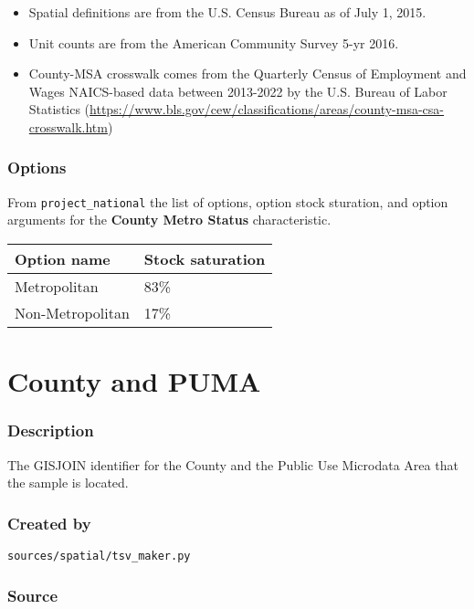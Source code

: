 \begin{itemize}
 
\item
  Spatial definitions are from the U.S. Census Bureau as of July 1,
  2015.
\item
  Unit counts are from the American Community Survey 5-yr 2016.
\item
  County-MSA crosswalk comes from the Quarterly Census of Employment and
  Wages NAICS-based data between 2013-2022 by the U.S. Bureau of Labor
  Statistics
  (\url{https://www.bls.gov/cew/classifications/areas/county-msa-csa-crosswalk.htm})
\end{itemize}

\subsubsection{Options}\label{options-28}

From \texttt{project\_national} the list of options, option stock
sturation, and option arguments for the \textbf{County Metro Status}
characteristic.

\begin{longtable}[]{@{}ll@{}}
\toprule\noalign{}
Option name & Stock saturation \\
\midrule\noalign{}
\endhead
\bottomrule\noalign{}
\endlastfoot
Metropolitan & 83\% \\
Non-Metropolitan & 17\% \\
\end{longtable}

\section{County and PUMA}\label{county_and_puma}

\subsubsection{Description}\label{description-29}

The GISJOIN identifier for the County and the Public Use Microdata Area that the sample is located.

\subsubsection{Created by}\label{created-by-29}

\texttt{sources/spatial/tsv\_maker.py}

\subsubsection{Source}\label{source-29}

